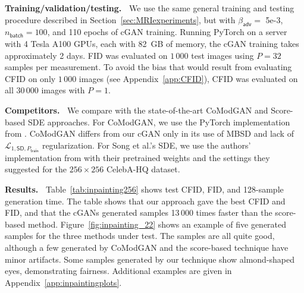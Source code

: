\documentclass{article}
\theoremstyle{plain}
\theoremstyle{definition}
\theoremstyle{remark}
\newcommand{\mc}[1]{\ensuremath{\mathcal{#1}}}
\newcommand{\Figref}[1]{Figure~\ref{fig:#1}}
\newcommand{\tabref}[1]{Table~\ref{tab:#1}}
\newcommand{\secref}[1]{Section~\ref{sec:#1}}
\newcommand{\appref}[1]{Appendix~\ref{app:#1}}
\newcommand{\batch}{_{\mathsf{batch}}}
\newcommand{\train}{_{\mathsf{train}}}
\newcommand{\LonestdPt}{\mc{L}_{1,\mathsf{SD},P\train}}
\newcommand{\betaadv}{\beta_{\mathsf{adv}}}
\begin{document}
\begin{table}[t]
  \caption{Average results for inpainting:
  FID was 
  computed from $1\,000$ test images with $P\!=\!32$,
  while CFID was computed from all 30\,000 images with $P\!=\!1$}
  \label{tab:inpainting256}
  \centering
  \vspace{0.1in}
\end{table}

\textbf{Training/validation/testing.~}
We use the same general training and testing procedure described in \secref{MRIexperiments}, but with $\betaadv=$ 5e-3, $n\batch=100$, and 110 epochs of cGAN training.
Running PyTorch on a server with 4 Tesla A100 GPUs, each with 82~GB of memory, the cGAN training takes approximately 2 days.
FID was evaluated on $1\,000$ test images using $P\!=\!32$ samples per measurement.
To avoid the bias that would result from evaluating CFID on only $1\,000$ images (see \appref{CFID}), CFID was evaluated on all $30\,000$ images with $P=1$. 

\textbf{Competitors.~} 
We compare with the state-of-the-art CoModGAN \cite{Zhao:ICLR:21}
and Score-based SDE \cite{Song:ICLR:21} approaches.
For CoModGAN, we use the PyTorch implementation from \cite{Zeng:github:22}. 
CoModGAN differs from our cGAN only in its use of MBSD and lack of $\LonestdPt$ regularization.
For Song et al.'s SDE, we use the authors' implementation from \cite{Song:github:21b} with their pretrained weights and the settings they suggested for the $256\times256$ CelebA-HQ dataset.

\textbf{Results.~} 
\tabref{inpainting256} shows test CFID, FID, and 128-sample generation time.
The table shows that our approach gave the best CFID and FID, and that the cGANs generated samples 13\,000 times faster than the score-based method.
\Figref{inpainting_22} shows an example of five generated samples for the three methods under test. 
The samples are all quite good, although a few generated by CoModGAN and the score-based technique have minor artifacts.  
Some samples generated by our technique show almond-shaped eyes, demonstrating fairness.
Additional examples are given in \appref{inpaintingplots}.
\end{document}
